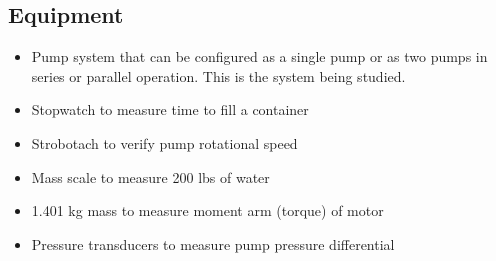 \subsection{Equipment}
\begin{itemize}
    \item Pump system that can be configured as a single pump or as two pumps in series or parallel operation. This is the system being studied.
    \item Stopwatch to measure time to fill a container 
    \item Strobotach to verify pump rotational speed
    \item Mass scale to measure 200 lbs of water
    \item 1.401 kg mass to measure moment arm (torque) of motor
    \item Pressure transducers to measure pump pressure differential
\end{itemize}

